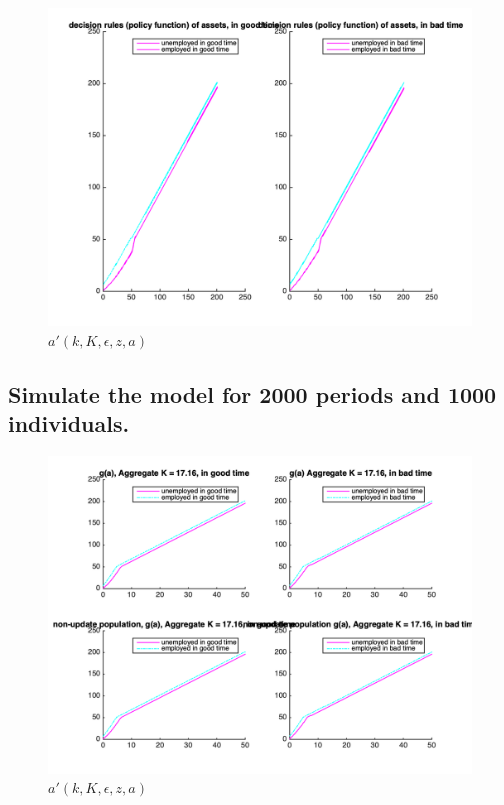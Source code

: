 \begin{figure}[htbp]
\centering
\includegraphics[width=\textwidth]{img/Q2_1_b.png}
\caption{$a'(k,K,\epsilon,z,a)$}
\end{figure}

\pagebreak
\subsection{Simulate the model for 2000 periods and 1000 individuals.}
\begin{figure}[htbp]
\centering
\includegraphics[width=\textwidth]{img/Q3_2_a.png}
\caption{$a'(k,K,\epsilon,z,a)$}
\end{figure}


